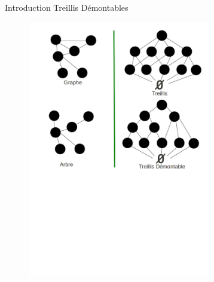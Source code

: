 \documentclass{beamer}
\begin{document}
  \begin{frame}{Introduction}
  \LARGE {\textrm{Treillis Démontables}}
   \begin{figure}
	\includegraphics[width=8cm]{images/memoire_figure4.png} 
    \end{figure}
  \end{frame}
\end{document}
